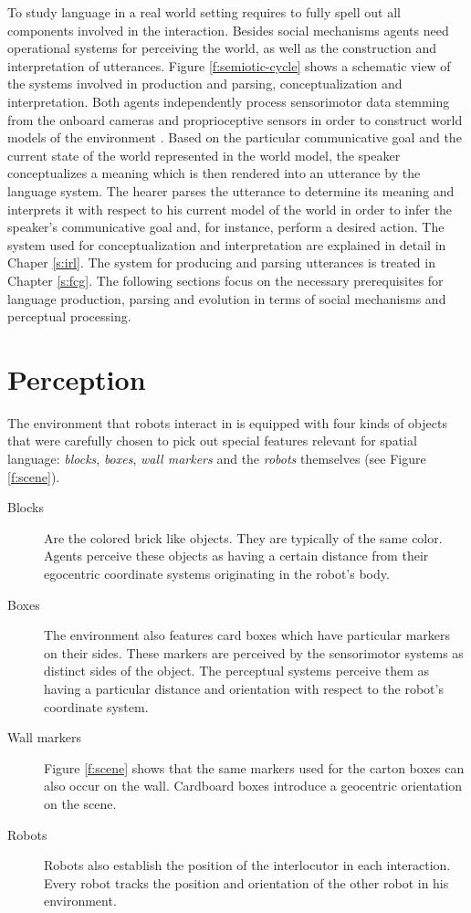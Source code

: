 To study language in a real world  setting requires to fully spell out 
all components involved in the interaction.
Besides social mechanisms agents need operational systems for perceiving
the world, as well as the construction and interpretation of utterances. 
Figure \ref{f:semiotic-cycle} shows a schematic view of the systems
involved in production and parsing, conceptualization and interpretation. 
Both agents independently process sensorimotor data stemming from
the onboard cameras and proprioceptive sensors in order to construct 
world models of the environment 
\citep{spranger2008grounded,spranger2012perception}. 
Based on the particular communicative goal and the current state of the 
world represented in the world model, the speaker conceptualizes a meaning 
which is then rendered into an utterance by the language system. 
The hearer parses the utterance to determine its meaning and 
interprets it with respect to his current model of the world in order 
to infer the speaker's communicative goal and, for instance, 
perform a desired action. The system used for conceptualization
and interpretation are explained in detail in Chaper \ref{s:irl}.
The system for producing and parsing utterances is treated in
Chapter \ref{s:fcg}. 
The following sections focus on the necessary prerequisites for 
language production, parsing and evolution in terms of social mechanisms and 
perceptual processing.

\section{Perception}
\label{s:perception}
The environment that robots interact in is equipped with four kinds of objects
that were carefully chosen to pick out special features relevant for spatial language:
\emph{blocks}, \emph{boxes}, \emph{wall markers} and the \emph{robots} themselves 
(see Figure \ref{f:scene}). 
\begin{description}
\item[Blocks] Are the colored brick like objects. They are typically of the same color.
Agents perceive these objects as having a certain distance from their 
egocentric coordinate systems originating in the robot's body.
\item[Boxes] The environment also features card boxes which have 
particular markers on their sides. These markers are perceived by the sensorimotor 
systems as distinct sides of the object. The perceptual systems
perceive them as having a particular distance and orientation with
respect to the robot's coordinate system. 
\item[Wall markers] Figure \ref{f:scene} shows that the same markers
used for the carton boxes can also occur on the wall.
Cardboard boxes introduce a geocentric orientation on the scene.
\item[Robots] Robots also establish the position of the interlocutor in
each interaction. Every robot tracks the position and orientation of the
other robot in his environment.
\end{description}


